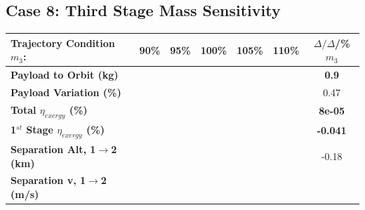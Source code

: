 \subsection{Case 8: Third Stage Mass Sensitivity}\label{sec:m3noReturn}

\begin{table}[ht]
	\centering
	
	\begin{tabular}{l c c c c c c} 
		\hline \textbf{Trajectory Condition}   \qquad  $m_{3}$:
		&90\%
		&95\%
		&100\%
		&105\%
		&110\%
		& $\Delta/\Delta$/\%$m_{3}$
		\\
		\hline \textbf{Payload to Orbit (kg)}
		& \textbf{\PayloadToOrbitmThreeNinetyNoReturn}
		& \textbf{\PayloadToOrbitmThreeNinetyFiveNoReturn}
		& \textbf{\PayloadToOrbitmThreeStandardNoReturn}
		& \textbf{\PayloadToOrbitmThreeOneHundredFiveNoReturn}
		& \textbf{\PayloadToOrbitmThreeOneHundredTenNoReturn}
		&\textbf{0.9}
		\\
		\textbf{Payload Variation (\%)}
		& \PayloadVarmThreeNinetyNoReturn
		& \PayloadVarmThreeNinetyFiveNoReturn
		& \PayloadVarmThreeStandardNoReturn
		& \PayloadVarmThreeOneHundredFiveNoReturn
		& \PayloadVarmThreeOneHundredTenNoReturn
		&0.47
		\\
		\textbf{Total $\eta_{exergy}$ (\%)}
		& \textbf{\totalExergyEffmThreeNinetyNoReturn}
		& \textbf{\totalExergyEffmThreeNinetyFiveNoReturn}
		& \textbf{\totalExergyEffmThreeStandardNoReturn}
		& \textbf{\totalExergyEffmThreeOneHundredFiveNoReturn}
		& \textbf{\totalExergyEffmThreeOneHundredTenNoReturn}
		& \textbf{8e-05}
		\\
		\hline 
		\textbf{1$^{st}$ Stage $\eta_{exergy}$ (\%)}
		& \textbf{\firstExergyEffmThreeNinetyNoReturn}
		& \textbf{\firstExergyEffmThreeNinetyFiveNoReturn}
		& \textbf{\firstExergyEffmThreeStandardNoReturn}
		& \textbf{\firstExergyEffmThreeOneHundredFiveNoReturn}
		& \textbf{\firstExergyEffmThreeOneHundredTenNoReturn}
		& \textbf{-0.041}
		\\
		\textbf{Separation Alt, 1$\rightarrow$2 (km)}
		& \firstsecondSeparationAltmThreeNinetyNoReturn
		& \firstsecondSeparationAltmThreeNinetyFiveNoReturn
		& \firstsecondSeparationAltmThreeStandardNoReturn
		& \firstsecondSeparationAltmThreeOneHundredFiveNoReturn
		& \firstsecondSeparationAltmThreeOneHundredTenNoReturn
		&-0.18
		\\
		\textbf{Separation v, 1$\rightarrow$2 (m/s)}
		& \firstsecondSeparationvmThreeNinetyNoReturn
		& \firstsecondSeparationvmThreeNinetyFiveNoReturn
		& \firstsecondSeparationvmThreeStandardNoReturn

\end{tabular}
\end{table}
